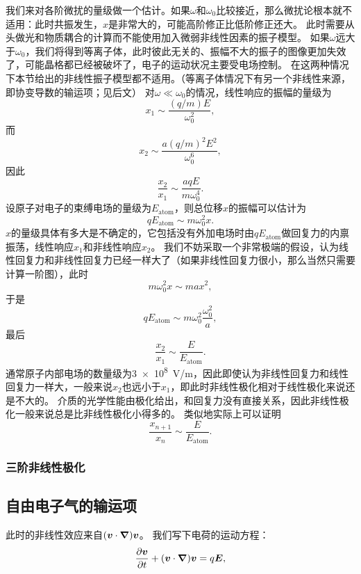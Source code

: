 我们来对各阶微扰的量级做一个估计。如果$\omega$和$\omega_0$比较接近，那么微扰论根本就不适用：此时共振发生，$x$是非常大的，可能高阶修正比低阶修正还大。
此时需要从头做光和物质耦合的计算而不能使用加入微弱非线性因素的振子模型。
如果$\omega$远大于$\omega_0$，我们将得到等离子体，此时彼此无关的、振幅不大的振子的图像更加失效了，可能晶格都已经被破坏了，电子的运动状况主要受电场控制。
在这两种情况下本节给出的非线性振子模型都不适用。（等离子体情况下有另一个非线性来源，即协变导数的输运项；见后文）
对$\omega \ll \omega_0$的情况，线性响应的振幅的量级为
\[
    x_1 \sim \frac{(q/m) E}{\omega_0^2},
\]
而
\[
    x_2 \sim \frac{a (q/m)^2 E^2}{\omega_0^6},
\]
因此
\begin{equation}
    \frac{x_2}{x_1} \sim \frac{a q E}{m \omega_0^4}.
\end{equation}
设原子对电子的束缚电场的量级为$E_\text{atom}$，则总位移$x$的振幅可以估计为
\[
    q E_\text{atom} \sim m \omega_0^2 x .
\]
$x$的量级具体有多大是不确定的，它包括没有外加电场时由$q E_\text{atom}$做回复力的内禀振荡，线性响应$x_1$和非线性响应$x_2$。
我们不妨采取一个非常极端的假设，认为线性回复力和非线性回复力已经一样大了（如果非线性回复力很小，那么当然只需要计算一阶图），此时
\[
    m \omega_0^2 x \sim m a x^2,
\]
于是
\[
    q E_\text{atom} \sim m \omega_0^2 \frac{\omega_0^2}{a},
\]
最后
\begin{equation}
    \frac{x_2}{x_1} \sim \frac{E}{E_\text{atom}}.
\end{equation}
通常原子内部电场的数量级为\SI{3e8}{V/m}，因此即使认为非线性回复力和线性回复力一样大，一般来说$x_2$也远小于$x_1$，即此时非线性极化相对于线性极化来说还是不大的。
介质的光学性能由极化给出，和回复力没有直接关系，因此非线性极化一般来说总是比非线性极化小得多的。
类似地实际上可以证明
\begin{equation}
    \frac{x_{n+1}}{x_n} \sim \frac{E}{E_\text{atom}}.
\end{equation}

\subsubsection{三阶非线性极化}

\subsection{自由电子气的输运项}

此时的非线性效应来自$(\vb*{v} \cdot \grad) \vb*{v}$。
我们写下电荷的运动方程：
\begin{equation}
    \pdv{\vb*{v}}{t} + (\vb*{v} \cdot \grad) \vb*{v} = q \vb*{E},
\end{equation}

